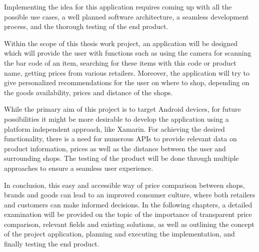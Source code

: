 Implementing the idea for this application requires coming up with all the possible use cases, a well planned  software architecture, a seamless development process, and the thorough testing of the end product. 

\pagebreak

Within the scope of this thesis work project, an application will be designed which will provide the user with functions such as using the camera for scanning the bar code of an item, searching for these items with this code or product name, getting prices from various retailers. Moreover, the application will try to give personalized recommendations for the user on where to shop, depending on the goods availability, prices and distance of the shops.

While the primary aim of this project is to target Android devices, for future possibilities it might be more desirable to develop the application using a platform independent approach, like Xamarin. For achieving the desired functionality, there is a need for numerous APIs to provide relevant data on product information, prices as well as the distance between the user and surrounding shops. The testing of the product will be done through multiple approaches to ensure a seamless user experience.

In conclusion, this easy and accessible way of price comparison between shops, brands and goods can lead to an improved consumer culture, where both retailers and customers can make informed decisions. In the following chapters, a detailed examination will be provided on the topic of the importance of transparent price comparison, relevant fields and existing solutions, as well as outlining the concept of the project application, planning and executing the implementation, and finally testing the end product.



